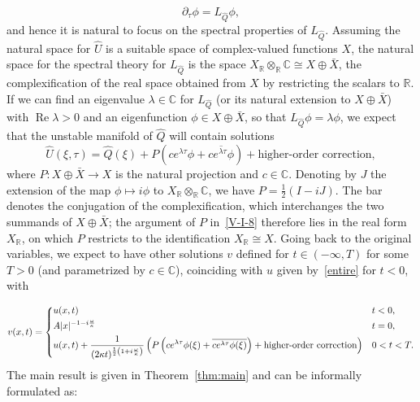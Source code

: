 \documentclass[11pt]{article}
\newcommand{\conj}[1]{\overline{#1}}
\renewcommand{\Re}{\operatorname{Re}}
\newcommand{\RR}{\mathbb R}
\begin{document}
\begin{equation*}
  \partial_\tau\phi=L_{\hat{Q}}\phi,
\end{equation*}
and hence it is natural to focus on the spectral properties of
\(L_{\hat{Q}}\). Assuming the natural space for \(\hat{U}\) is a
suitable space of complex-valued functions \(X\), the natural space
for the spectral theory for \(L_{\hat{Q}}\) is the space
\(X_{\RR}\otimes_{\RR}\mathbb{C}\cong X\oplus \bar{X}\), the
complexification of the real space obtained from \(X\) by restricting
the scalars to \(\RR\). If we can find an eigenvalue
\(\lambda\in \mathbb{C}\) for \(L_{\hat{Q}}\) (or its natural
extension to \(X\oplus\bar{X}\)) with \(\Re\lambda>0\) and an
eigenfunction \(\phi\in X\oplus \bar{X}\), so that
\(L_{\hat{Q}}\phi=\lambda\phi\), we expect that the unstable manifold
of \(\hat{Q}\) will contain solutions
\begin{equation}\label{V-I-8}
  \hat{U}(\xi,\tau)=\hat{Q}(\xi) + P\left(ce^{\lambda \tau}\phi+\conj{ce^{\lambda \tau}\phi}\right)+\text{higher-order correction},
\end{equation}
where \(P\colon X\oplus \bar{X}\to X\) is the natural projection and
\(c\in \mathbb{C}\). Denoting by \(J\) the extension of the map
\(\phi\mapsto i\phi\) to \(X_{\RR}\otimes_{\RR}\mathbb{C}\), we have
\(P=\frac{1}{2}(I-iJ)\). The bar denotes the conjugation of the
complexification, which interchanges the two summands of
\(X\oplus\bar{X}\); the argument of \(P\) in~\eqref{V-I-8} therefore
lies in the real form \(X_{\RR}\), on which \(P\) restricts to the
identification \(X_{\RR}\cong X\). Going back to the original
variables, we expect to have other solutions \(v\) defined for
\(t\in(-\infty,T)\) for some \(T>0\) (and parametrized by
\(c\in \mathbb{C}\)), coinciding with \(u\) given by~\eqref{entire}
for \(t<0\), with

\begin{equation}\label{secondsol}
  v(x,t)=
  \begin{dcases}
    u(x,t)
    & t<0,
    \\
    A|x|^{-1-i\frac{\omega}{\kappa}}
    & t=0,
    \\
    u(x,t)+\frac{1}{(2\kappa t)^{\frac{1}{2}\left(1 + i \frac{\omega}{\kappa}\right)}}
    \left(P\left(ce^{\lambda\tau}\phi(\xi)+\conj{ce^{\lambda\tau}\phi(\xi)}\right)+\text{higher-order correction}\right)
    & 0<t<T.
  \end{dcases}
\end{equation}
The main result is given in Theorem~\ref{thm:main} and can be
informally formulated as:
\end{document}
